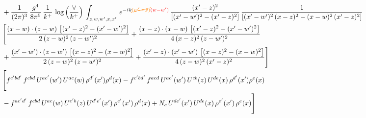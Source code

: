 \documentclass[9pt]{article}
\numberwithin{equation}{section}
\begin{document}
\begin{align}
& +\frac{1}{(2\pi)^{3}}\, \frac{g^{4}}{8\pi^{5}}\,\frac{1}{k^{+}}\,\log{\left(\frac{\vee}{k^{+}}\right)}\,\int_{z,w,w^{\prime},x,x'}\, e^{-ik{\color{orange}\cancel{(w^{\prime}-w)}}{\color{red}(w-w^{\prime})}}\,\frac{(x'-z)^{2}}{\left[(x'-w')^{2}-(x'-z)^{2}\right]}\,\frac{1}{\left[(x'-w')^{2}\,(x-z)^{2} - (x-w)^{2}\,(x'-z)^{2}\right]}\notag \\ & \Bigg[\frac{(x-w)\cdot (z-w)\, \left[(x'-z)^{2}-(x'-w')^{2}\right]}{2\, (z-w)^{2}\, (z-w')^{2}}  + \frac{(x-z)\cdot (x-w)\,\left[(x'-z)^{2}-(x'-w')^{2}\right] }{4\,(x-z)^{2}\,(z-w')^{2}}\notag \\ & +\frac{(x'-w')\cdot (z-w')\, \left[(x-z)^{2}-(x-w)^{2}\right]}{2\, (z-w)^{2}\, (z-w')^{2}}+ \frac{(x'-z)\cdot (x'-w')\, \left[(x-z)^{2}-(x-w)^{2}\right]}{4\, (z-w)^{2}\,(x'-z)^{2}}\Bigg]\notag \\ &  \Bigg[f^{c'bd'}\,f^{cbd}\, U^{ac'}(w')\,U^{ac}(w)\,\rho^{d'}(x')\rho^{d}(x)- f^{c'bd'}\,f^{acd}\,U^{ac'}(w')\,U^{cb}(z)\,U^{de}(x)\,\rho^{d'}(x')\rho^{e}(x) \notag \\ & -f^{ac'd'}\,f^{cbd}\,U^{ac}(w)\,U^{c'b}(z)\,U^{d'e'}(x')\,\rho^{e'}(x')\,\rho^{d}(x) +N_{c}\,U^{de'}(x')\,U^{de}(x)\,\rho^{e'}(x')\,\rho^{e}(x)\Bigg]
\end{align}
\end{document}
